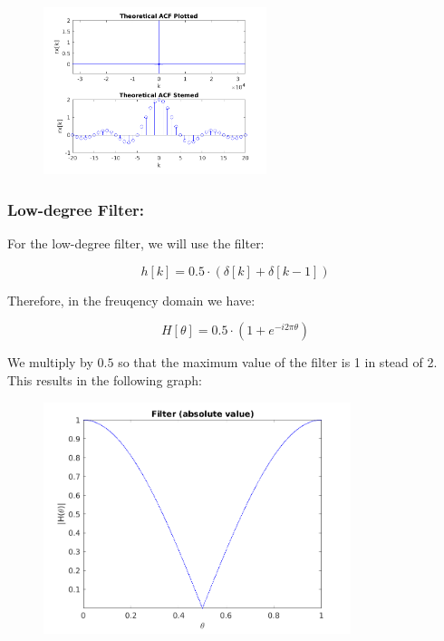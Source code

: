 \documentclass[a4paper,11pt]{article}
\begin{document}
\begin{figure}[!hp]
    \begin{center}
      \includegraphics[width=0.58\textwidth]{images/study1/r_hd_th.png}
    \end{center}
\end{figure}

\newpage

\subsubsection{Low-degree Filter:}

For the low-degree filter, we will use the filter:

\begin{equation}\label{eq:H_ld_th}
  h[k] = 0.5 \cdot (\delta[k] + \delta[k-1])
\end{equation}

Therefore, in the freuqency domain we have:

\begin{equation}\label{eq:H_ld_th}
  H[\theta] = 0.5\cdot (1+e^{-i 2 \pi \theta})
\end{equation}

We multiply by $0.5$ so that the maximum value of the filter is 1 in stead of
2. \\

This results in the following graph:

\begin{figure}[!hp]
    \begin{center}
      \includegraphics[width=0.8\textwidth]{images/study1/H_ld_th.png}
    \end{center}
\end{figure}
\end{document}
